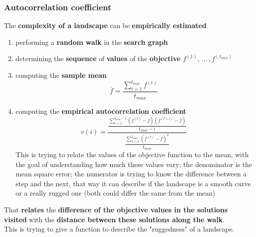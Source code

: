 \documentclass[11pt]{article}
\begin{document}
	\subsubsection{Autocorrelation coefficient}
	The \textbf{complexity of a landscape} can be \textbf{empirically estimated}
	\begin{enumerate}
		\item performing a \textbf{random walk} in the \textbf{search graph}
		
		\item determining the \textbf{sequence} of \textbf{values} of the \textbf{objective} $f^{(1)}, \, ... \, , f^{(t_{max})}$
		
		\item computing the \textbf{sample mean} 
		$$ \overline{f} = \frac{\displaystyle \sum_{t=1}^{t_{max}} f^{(t)}}{\displaystyle t_{max}} $$
		
		\item computing the \textbf{empirical autocorrelation coefficient}
		$$ r(i) = \frac{\displaystyle \frac{\displaystyle \sum_{t=1}^{t_{max} - i} \left(f^{(t)} - \overline{f}\right) \left(f^{(t+i)} - \overline{f}\right) }{\displaystyle t_{max} - i } }{\displaystyle \frac{\displaystyle \sum_{t=1}^{t_{max}} \left(f^{(t)} - \overline{f}\right)^2 }{\displaystyle t_{max} }}$$
		This is trying to relate the values of the objective function to the mean, with the goal of understanding how much these values vary; the denominator is the mean square error; the numerator is trying to know the difference between a step and the next, that way it can describe if the landscape is a smooth curve or a really rugged one (both could differ the same from the mean)
	\end{enumerate}
	That \textbf{relates} the \textbf{difference of the objective values in the solutions visited} with the \textbf{distance between these solutions along the walk}.\\
	
	This is trying to give a function to describe the "ruggedness" of a landscape.\\
	
	\newpage
	
\end{document}
